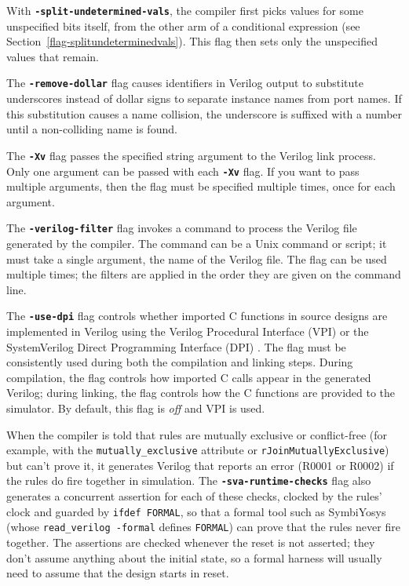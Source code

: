 \documentclass{article}
\newcommand{\te}[1]{\texttt{#1}}
\begin{document}
With {\bf\tt -split-undetermined-vals}, the compiler first picks values
for some unspecified bits itself, from the other arm of a conditional
expression (see Section~\ref{flag-splitundeterminedvals}).  This flag then
sets only the unspecified values that remain.

The {\bf\tt -remove-dollar} flag causes identifiers in Verilog output
to substitute underscores instead of dollar signs to separate instance
names from port names.  If this substitution causes a name collision,
the underscore is suffixed with a number until a non-colliding name is
found.

The {\bf\tt -Xv} flag passes the specified string argument to the Verilog link
process.   Only one argument can be passed with each {\bf\tt -Xv}
flag. If you want to pass multiple arguments, then the flag must be
specified multiple times, once for each argument.

The {\bf\tt -verilog-filter} flag invokes a command to process the
 Verilog file generated by the compiler.  The command can be a Unix
 command or script;
it must take a single argument, the name of the Verilog file.    The
 flag can be used multiple times; the filters are applied in the order
 they are given on the command line.

The {\bf\tt -use-dpi} flag controls whether imported C functions in
source designs are implemented in Verilog using
the Verilog Procedural Interface (VPI)
or the SystemVerilog Direct Programming Interface (DPI)
.
The flag must be consistently used during both the compilation and
linking steps.
During compilation, the flag controls how imported C calls appear
in the generated Verilog;
during linking, the flag controls how the C functions are provided
to the simulator.
By default, this flag is \emph{off} and VPI is used.

When the compiler is told that rules are mutually exclusive or
conflict-free (for example, with the \te{mutually\_exclusive}
attribute or \te{rJoinMutuallyExclusive}) but can't prove it, it
generates Verilog that reports an error (R0001 or R0002) if the rules
do fire together in simulation.
The {\bf\tt -sva-runtime-checks} flag also generates a concurrent
assertion for each of these checks, clocked by the rules' clock and
guarded by \te{\textasciigrave{}ifdef FORMAL},
so that a formal tool such as SymbiYosys (whose
\te{read\_verilog -formal} defines \te{FORMAL}) can prove that the rules
never fire together.
The assertions are checked whenever the reset is not asserted; they
don't assume anything about the initial state, so a formal harness will
usually need to assume that the design starts in reset.
\end{document}
